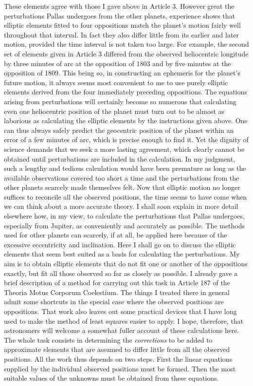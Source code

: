 These elements agree with those I gave above in Article 3.
However great the perturbations Pallas undergoes from the other planets, experience shows that elliptic elements fitted to four oppositions match the planet’s motion fairly well throughout that interval. In fact they also differ little from its earlier and later motion, provided the time interval is not taken too large. For example, the second set of elements given in Article 3 differed from the observed heliocentric longitude by three minutes of arc at the opposition of 1803 and by five minutes at the opposition of 1809. This being so, in constructing an ephemeris for the planet’s future motion, it always seems most convenient to me to use purely elliptic elements derived from the four immediately preceding oppositions. The equations arising from perturbations will certainly become so numerous that calculating even one heliocentric position of the planet must turn out to be almost as laborious as calculating the elliptic elements by the instructions given above. One can thus always safely predict the geocentric position of the planet within an error of a few minutes of arc, which is precise enough to find it.
Yet the dignity of science demands that we seek a more lasting agreement, which clearly cannot be obtained until perturbations are included in the calculation. In my judgment, such a lengthy and tedious calculation would have been premature as long as the available observations covered too short a time and the perturbations from the other planets scarcely made themselves felt. Now that elliptic motion no longer suffices to reconcile all the observed positions, the time seems to have come when we can think about a more accurate theory. I shall soon explain in more detail elsewhere how, in my view, to calculate the perturbations that Pallas undergoes, especially from Jupiter,
as conveniently and accurately as possible. The methods used for other planets can scarcely, if at all, be applied here because of the excessive eccentricity and inclination. Here I shall go on to discuss the elliptic elements that seem best suited as a basis for calculating the perturbations. My aim is to obtain elliptic elements that do not fit one or another of the oppositions exactly, but fit all those observed so far as closely as possible. I already gave a brief description of a method for carrying out this task in Article 187 of the Theoria Motus Corporum Coelestium. The things I treated there in general admit some shortcuts in the special case where the observed positions are oppositions. That work also leaves out some practical devices that I have long used to make the method of least squares easier to apply. I hope, therefore, that astronomers will welcome a somewhat fuller account of these calculations here. The whole task consists in determining the \textit{corrections} to be added to approximate elements that are assumed to differ little from all the observed positions. All the work thus depends on two steps. First the linear equations supplied by the individual observed positions must be formed. Then the most suitable values of the unknowns must be obtained from these equations.
